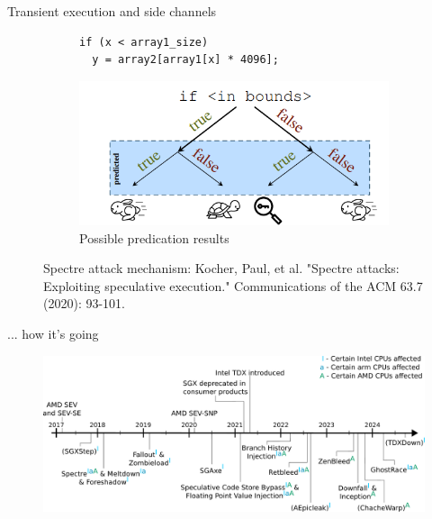 \documentclass[aspectratio=169]{beamer}
\begin{document}
\begin{frame}[fragile]{Transient execution and side channels}
    \begin{center}
        \begin{figure}
            \begin{subfigure}[]{0.6\textwidth}
                \begin{lstlisting}
if (x < array1_size)
  y = array2[array1[x] * 4096];
                \end{lstlisting}
            \end{subfigure}
            \begin{subfigure}[]{0.45\textwidth}
                \begin{center}
                    \includegraphics[width=\textwidth]{images/spectre_predict.png}
                    \caption{Possible predication results}
                \end{center}
            \end{subfigure}
            \caption{Spectre attack mechanism: Kocher, Paul, et al. "Spectre attacks: Exploiting speculative execution." \footnotesize{Communications of the ACM 63.7 (2020): 93-101.}}
        \end{figure}
    \end{center}
\end{frame}
\begin{frame}{... how it's going}
    \begin{figure}
        \begin{center}
            \includegraphics[width=\textwidth]{images/timeline.pdf}
        \end{center}
    \end{figure}
\end{frame}
\end{document}
